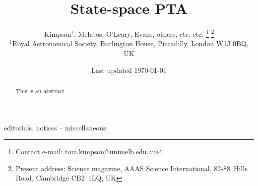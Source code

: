 \documentclass[fleqn,usenatbib,useAMS]{mnras}
\title[Kalman PTA]{State-space PTA}
\author[Kimpson]{Kimpson$^{1}$, Melatos, O'Leary, Evans, others, etc. etc. %
\thanks{Contact e-mail: \href{tom.kimpson@unimelb.edu.au}{tom.kimpson@unimelb.edu.au}}%
\thanks{Present address: Science magazine, AAAS Science International, \mbox{82-88}~Hills Road, Cambridge CB2~1LQ, UK}%
\\
$^{1}$Royal Astronomical Society, Burlington House, Piccadilly, London W1J 0BQ, UK}
\date{Last updated \today}
\begin{document}
\label{firstpage}
\pagerange{\pageref{firstpage}--\pageref{lastpage}}
\maketitle

\begin{abstract}
This is an abstract
\end{abstract}

\begin{keywords}
editorials, notices -- miscellaneous
\end{keywords}



\begingroup
\let\clearpage\relax
\endgroup
\newpage
\end{document}
